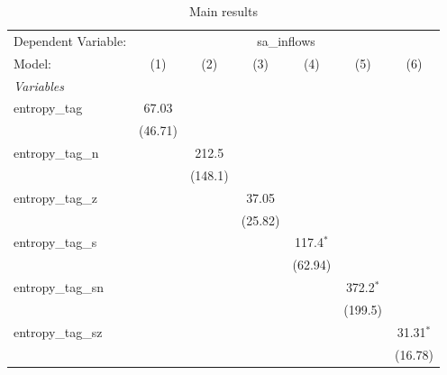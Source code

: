 
\begin{table}[htbp]
   \centering
   \footnotesize
   \begin{threeparttable}[b]
      \caption{\label{tab:reg_sa_inflows_tag.tex} Main results}
      \begin{tabular}{lcccccc}
         \tabularnewline \midrule \midrule
         Dependent Variable: & \multicolumn{6}{c}{sa\_inflows}\\
         Model:              & (1)            & (2)            & (3)            & (4)            & (5)            & (6)\\  
         \midrule
         \emph{Variables}\\
         entropy\_tag        & 67.03          &                &                &                &                &   \\   
                             & (46.71)        &                &                &                &                &   \\   
         entropy\_tag\_n     &                & 212.5          &                &                &                &   \\   
                             &                & (148.1)        &                &                &                &   \\   
         entropy\_tag\_z     &                &                & 37.05          &                &                &   \\   
                             &                &                & (25.82)        &                &                &   \\   
         entropy\_tag\_s     &                &                &                & 117.4$^{*}$    &                &   \\   
                             &                &                &                & (62.94)        &                &   \\   
         entropy\_tag\_sn    &                &                &                &                & 372.2$^{*}$    &   \\   
                             &                &                &                &                & (199.5)        &   \\   
         entropy\_tag\_sz    &                &                &                &                &                & 31.31$^{*}$\\   
                             &                &                &                &                &                & (16.78)\\   

\end{tabular}
\end{threeparttable}
\end{table}

